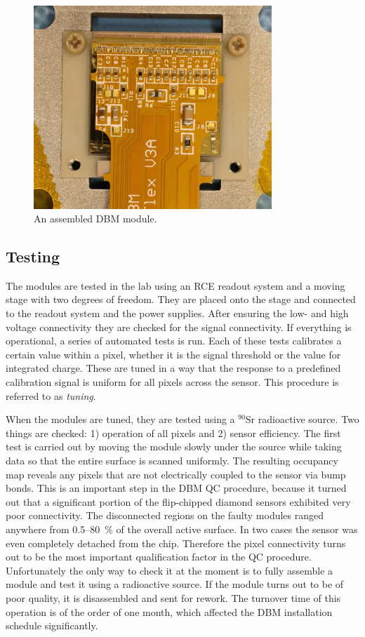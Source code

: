 \begin{figure}[!t]
\centering
\includegraphics[width=0.8\textwidth]{05_current_monitoring/plots/dbmmod1}
\caption{An assembled DBM module.}
\label{fig:completedmod}
\end{figure}

\subsection{Testing}
The modules are tested in the lab using an RCE readout system and a moving stage with two degrees of freedom. They are placed onto the stage and connected to the readout system and the power supplies. After ensuring the low- and high voltage connectivity they are checked for the signal connectivity. If everything is operational, a series of automated tests is run. Each of these tests calibrates a certain value within a pixel, whether it is the signal threshold or the value for integrated charge. These are tuned in a way that the response to a predefined calibration signal is uniform for all pixels across the sensor. This procedure is referred to as \emph{tuning}. 

When the modules are tuned, they are tested using a $^{90}$Sr radioactive source. Two things are checked: 1) operation of all pixels and 2) sensor efficiency. The first test is carried out by moving the module slowly under the source while taking data so that the entire surface is scanned uniformly. The resulting occupancy map reveals any pixels that are not electrically coupled to the sensor via bump bonds. This is an important step in the DBM QC procedure, because it turned out that a significant portion of the flip-chipped diamond sensors exhibited very poor connectivity. The disconnected regions on the faulty modules ranged anywhere from 0.5--80~\% of the overall active surface. In two cases the sensor was even completely detached from the chip. Therefore the pixel connectivity turns out to be the most important qualification factor in the QC procedure. Unfortunately the only way to check it at the moment is to fully assemble a module and test it using a radioactive source. If the module turns out to be of poor quality, it is disassembled and sent for rework. The turnover time of this operation is of the order of one month, which affected the DBM installation schedule significantly. 

